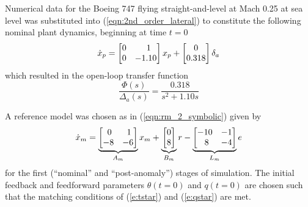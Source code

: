 Numerical data for the Boeing 747 flying straight-and-level at Mach 0.25 at sea level \cite{heffley1972aircraft} was substituted into (\ref{eqn:2nd_order_lateral}) to constitute the following nominal plant dynamics, beginning at time $t = 0$
\begin{equation}
		\dot{x}_p = \begin{bmatrix}
			0 & \hfil 1 \\ 0 & -1.10
		\end{bmatrix} x_p + \begin{bmatrix}
			0 \\ 0.318
		\end{bmatrix} \delta_a
\end{equation} \noindent which resulted in the open-loop transfer function 
\begin{equation}
		\frac{\Phi(s)}{\Delta_a(s)} = \frac{0.318}{s^2 + 1.10s}
\end{equation}

A reference model was chosen as in (\ref{eqn:rm_2_symbolic}) given by
\begin{equation}
	\dot{x}_m = \underbrace{\begin{bmatrix}
		\hfil 0 & \hfil 1\\ -8 & -6
	\end{bmatrix}}_{A_m} x_m + \underbrace{\begin{bmatrix}
		0 \\ 8
	\end{bmatrix}}_{B_m} r - \underbrace{\begin{bmatrix}
		\hfil -10 & \hfil -1 \\ \hfil 8 & \hfil -4
	\end{bmatrix}}_{L_m} e
	\label{eqn:rm_2}
\end{equation}
\noindent for the first (``nominal'' and ``post-anomaly'') stages of simulation. The initial feedback and feedforward parameters $\theta(t=0)$ and $q(t=0)$ are chosen such that the matching conditions of (\ref{e:tstar}) and (\ref{e:qstar}) are met.

